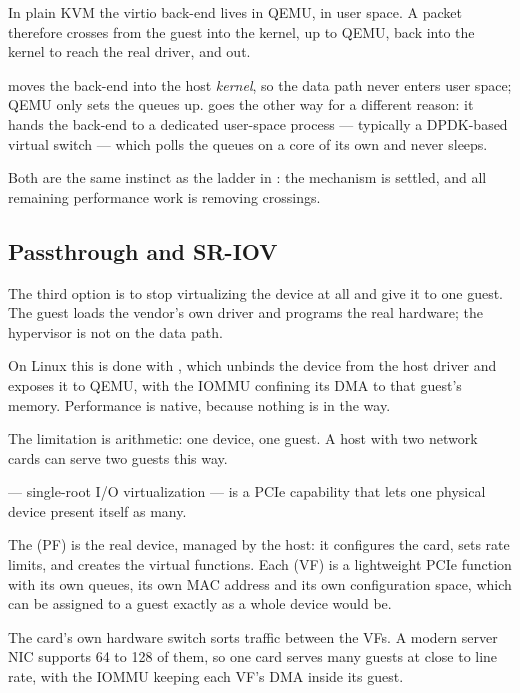 \begin{conceptbox}
In plain KVM the virtio back-end lives in QEMU, in user space. A packet
therefore crosses from the guest into the kernel, up to QEMU, back into the
kernel to reach the real driver, and out.

\smallskip
{} moves the back-end into the host \emph{kernel}, so the data path
never enters user space; QEMU only sets the queues up.  goes
the other way for a different reason: it hands the back-end to a dedicated
user-space process --- typically a DPDK-based virtual switch --- which polls
the queues on a core of its own and never sleeps.

\smallskip
Both are the same instinct as the ladder in : the mechanism is
settled, and all remaining performance work is removing crossings.
\end{conceptbox}

\subsection{Passthrough and SR-IOV}

The third option is to stop virtualizing the device at all and give it to one
guest. The guest loads the vendor's own driver and programs the real hardware;
the hypervisor is not on the data path.

On Linux this is done with , which unbinds the device from the host
driver and exposes it to QEMU, with the IOMMU confining its DMA to that guest's
memory. Performance is native, because nothing is in the way.

The limitation is arithmetic: one device, one guest. A host with two network
cards can serve two guests this way.

\begin{definitionbox}
 --- single-root I/O virtualization --- is a PCIe capability that
lets one physical device present itself as many.

\smallskip
The  (PF) is the real device, managed by the host: it
configures the card, sets rate limits, and creates the virtual functions. Each
 (VF) is a lightweight PCIe function with its own
queues, its own MAC address and its own configuration space, which can be
assigned to a guest exactly as a whole device would be.

\smallskip
The card's own hardware switch sorts traffic between the VFs. A modern server
NIC supports 64 to 128 of them, so one card serves many guests at close to line
rate, with the IOMMU keeping each VF's DMA inside its guest.
\end{definitionbox}

